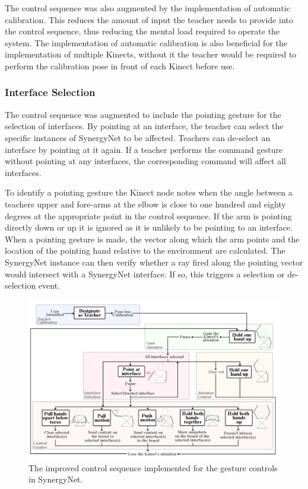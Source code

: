 \documentclass[link]{IWCOMP}
\begin{document}
The control sequence was also augmented by the implementation of automatic calibration.
This reduces the amount of input the teacher needs to provide into the control sequence, thus reducing the mental load required to operate the system.
The implementation of automatic calibration is also beneficial for the implementation of multiple Kinects, without it the teacher would be required to perform the calibration pose in front of each Kinect before use.

\subsubsection{Interface Selection}  
\label{subsubsec:studyImplementationInterfaceSelection}

The control sequence was augmented to include the pointing gesture for the selection of interfaces.
By pointing at an interface, the teacher can select the specific instances of SynergyNet to be affected.
Teachers can de-select an interface by pointing at it again.
If a teacher performs the command gesture without pointing at any interfaces, the corresponding command will affect all interfaces.

To identify a pointing gesture the Kinect node notes when the angle between a teachers upper and fore-arms at the elbow is close to one hundred and eighty degrees at the appropriate point in the control sequence.
If the arm is pointing directly down or up it is ignored as it is unlikely to be pointing to an interface.
When a pointing gesture is made, the vector along which the arm points and the location of the pointing hand relative to the environment are calculated.
The SynergyNet instance can then verify whether a ray fired along the pointing vector would intersect with a SynergyNet interface.
If so, this triggers a selection or de-selection event.

\begin{figure}[t]
  \centering
  \includegraphics[width=1\textwidth]{figures/control_sequence_flow_diagram.png}
  \caption{The improved control sequence implemented for the gesture controls in SynergyNet.}
  \label{fig:controlSequenceFlowDiagram}
\end{figure}
\end{document}
